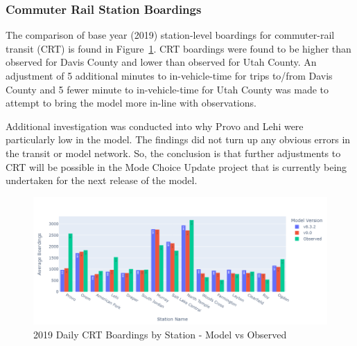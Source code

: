 \documentclass[
  letterpaper,
  DIV=11,
  numbers=noendperiod]{scrreprt}
\begin{document}
\hypertarget{commuter-rail-station-boardings}{%
\subsubsection{Commuter Rail Station
Boardings}\label{commuter-rail-station-boardings}}

The comparison of base year (2019) station-level boardings for
commuter-rail transit (CRT) is found in Figure~\ref{fig-pdf-fr-brd}. CRT
boardings were found to be higher than observed for Davis County and
lower than observed for Utah County. An adjustment of 5 additional
minutes to in-vehicle-time for trips to/from Davis County and 5 fewer
minute to in-vehicle-time for Utah County was made to attempt to bring
the model more in-line with observations.

Additional investigation was conducted into why Provo and Lehi were
particularly low in the model. The findings did not turn up any obvious
errors in the transit or model network. So, the conclusion is that
further adjustments to CRT will be possible in the Mode Choice Update
project that is currently being undertaken for the next release of the
model.

\begin{figure}[H]

{\centering \includegraphics{v9x/v900/whats-new/_pictures/pdf-fr-brd.png}

}

\caption{\label{fig-pdf-fr-brd}2019 Daily CRT Boardings by Station -
Model vs Observed}

\end{figure}
\end{document}
